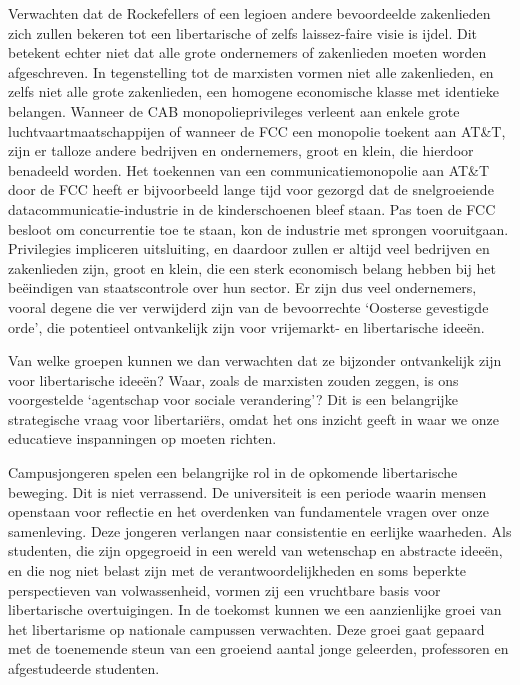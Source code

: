 \documentclass[
  a5paper,
  smalldemyvopaper,10pt,twoside,onecolumn,openright,extrafontsizes,hidelinks]{memoir}
\begin{document}
Verwachten dat de Rockefellers of een legioen andere bevoordeelde
zakenlieden zich zullen bekeren tot een libertarische of zelfs
laissez-faire visie is ijdel. Dit betekent echter niet dat alle grote
ondernemers of zakenlieden moeten worden afgeschreven. In tegenstelling
tot de marxisten vormen niet alle zakenlieden, en zelfs niet alle grote
zakenlieden, een homogene economische klasse met identieke belangen.
Wanneer de CAB monopolieprivileges verleent aan enkele grote
luchtvaartmaatschappijen of wanneer de FCC een monopolie toekent aan
AT\&T, zijn er talloze andere bedrijven en ondernemers, groot en klein,
die hierdoor benadeeld worden. Het toekennen van een
communicatiemonopolie aan AT\&T door de FCC heeft er bijvoorbeeld lange
tijd voor gezorgd dat de snelgroeiende datacommunicatie-industrie in de
kinderschoenen bleef staan. Pas toen de FCC besloot om concurrentie toe
te staan, kon de industrie met sprongen vooruitgaan. Privilegies
impliceren uitsluiting, en daardoor zullen er altijd veel bedrijven en
zakenlieden zijn, groot en klein, die een sterk economisch belang hebben
bij het beëindigen van staatscontrole over hun sector. Er zijn dus veel
ondernemers, vooral degene die ver verwijderd zijn van de bevoorrechte
`Oosterse gevestigde orde', die potentieel ontvankelijk zijn voor
vrijemarkt- en libertarische ideeën.

Van welke groepen kunnen we dan verwachten dat ze bijzonder ontvankelijk
zijn voor libertarische ideeën? Waar, zoals de marxisten zouden zeggen,
is ons voorgestelde `agentschap voor sociale verandering'? Dit is een
belangrijke strategische vraag voor libertariërs, omdat het ons inzicht
geeft in waar we onze educatieve inspanningen op moeten richten.

Campusjongeren spelen een belangrijke rol in de opkomende libertarische
beweging. Dit is niet verrassend. De universiteit is een periode waarin
mensen openstaan voor reflectie en het overdenken van fundamentele
vragen over onze samenleving. Deze jongeren verlangen naar consistentie
en eerlijke waarheden. Als studenten, die zijn opgegroeid in een wereld
van wetenschap en abstracte ideeën, en die nog niet belast zijn met de
verantwoordelijkheden en soms beperkte perspectieven van volwassenheid,
vormen zij een vruchtbare basis voor libertarische overtuigingen. In de
toekomst kunnen we een aanzienlijke groei van het libertarisme op
nationale campussen verwachten. Deze groei gaat gepaard met de
toenemende steun van een groeiend aantal jonge geleerden, professoren en
afgestudeerde studenten.
\end{document}
